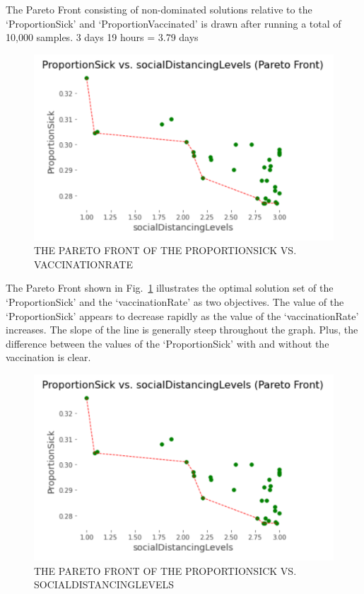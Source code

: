 \documentclass[smallextended]{svjour3}       %
\begin{document}
The Pareto Front consisting of non-dominated solutions relative to the ‘ProportionSick’ and ‘ProportionVaccinated’ is drawn after running a total of 10,000 samples.
3 days 19 hours = 3.79 days




\begin{figure}
	\includegraphics[width=\linewidth]{figures/pareto2.png}
	\caption{THE PARETO FRONT OF THE PROPORTIONSICK VS. VACCINATIONRATE\label{fig:pareto}}	
\end{figure}

The Pareto Front shown in Fig.~\ref{fig:pareto} illustrates the optimal solution set of the ‘ProportionSick’ and the ‘vaccinationRate’ as two objectives. The value of the ‘ProportionSick’ appears to decrease rapidly as the value of the ‘vaccinationRate’ increases. The slope of the line is generally steep throughout the graph. Plus, the difference between the values of the ‘ProportionSick’ with and without the vaccination is clear.


\begin{figure}
	\includegraphics[width=\linewidth]{figures/pareto2.png}
	\caption{THE PARETO FRONT OF THE PROPORTIONSICK VS. SOCIALDISTANCINGLEVELS\label{fig:pareto2}}	
\end{figure}
\end{document}
